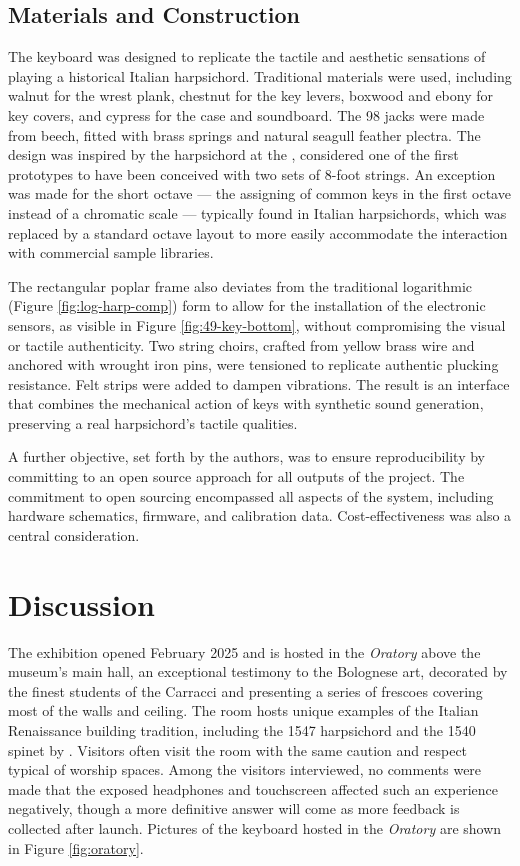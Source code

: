 \subsection{Materials and Construction}
The keyboard was designed to replicate the tactile and aesthetic sensations of playing a historical Italian harpsichord. Traditional materials were used, including walnut for the wrest plank, chestnut for the key levers, boxwood and ebony for key covers, and cypress for the case and soundboard. The 98 jacks were made from beech, fitted with brass springs and natural seagull feather plectra. The design was inspired by the  harpsichord at the , considered one of the first prototypes to have been conceived with two sets of 8-foot strings. An exception was made for the short octave --- the assigning of common keys in the first octave instead of a chromatic scale --- typically found in Italian harpsichords, which was replaced by a standard octave layout to more easily accommodate the interaction with commercial sample libraries. 

The rectangular poplar frame also deviates from the traditional logarithmic (Figure \ref{fig:log-harp-comp}) form to allow for the installation of the electronic sensors, as visible in Figure \ref{fig:49-key-bottom}, without compromising the visual or tactile authenticity. Two string choirs, crafted from yellow brass wire and anchored with wrought iron pins, were tensioned to replicate authentic plucking resistance. Felt strips were added to dampen vibrations. The result is an interface that combines the mechanical action of keys with synthetic sound generation, preserving a real harpsichord's tactile qualities.

A further objective, set forth by the authors, was to ensure reproducibility by committing to an open source approach for all outputs of the project. The commitment to open sourcing encompassed all aspects of the system, including hardware schematics, firmware, and calibration data. Cost-effectiveness was also a central consideration.

\section{Discussion}\label{context}

The exhibition opened February 2025 and is hosted in the \emph{Oratory} above the museum's main hall, an exceptional testimony to the Bolognese art, decorated by the finest students of the Carracci and presenting a series of frescoes covering most of the walls and ceiling. The room hosts unique examples of the Italian Renaissance building tradition, including the 1547 harpsichord and the 1540 spinet by . Visitors often visit the room with the same caution and respect typical of worship spaces. Among the visitors interviewed, no comments were made that the exposed headphones and touchscreen affected such an experience negatively, though a more definitive answer will come as more feedback is collected after launch. Pictures of the keyboard hosted in the \emph{Oratory} are shown in Figure \ref{fig:oratory}.

